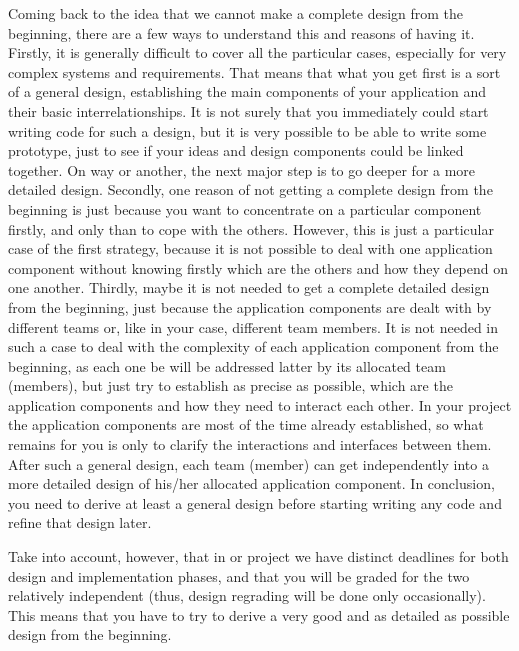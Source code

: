 Coming back to the idea that we cannot make a complete design from the beginning, there are a few ways to understand this and reasons of having it. Firstly, it is generally difficult to cover all the particular cases, especially for very complex systems and requirements. That means that what you get first is a sort of a general design, establishing the main components of your application and their basic interrelationships. It is not surely that you immediately could start writing code for such a design, but it is very possible to be able to write some prototype, just to see if your ideas and design components could be linked together. On way or another, the next major step is to go deeper for a more detailed design. Secondly, one reason of not getting a complete design from the beginning is just because you want to concentrate on a particular component firstly, and only than to cope with the others. However, this is just a particular case of the first strategy, because it is not possible to deal with one application component without knowing firstly which are the others and how they depend on one another. Thirdly, maybe it is not needed to get a complete detailed design from the beginning, just because the application components are dealt with by different teams or, like in your case, different team members. It is not needed in such a case to deal with the complexity of each application component from the beginning, as each one be will be addressed latter by its allocated team (members), but just try to establish as precise as possible, which are the application components and how they need to interact each other. In your \OSName{} project the application components are most of the time already established, so what remains for you is only to clarify the interactions and interfaces between them. After such a general design, each team (member) can get independently into a more detailed design of his/her allocated application component. 
In conclusion, you need to derive at least a general design before starting writing any code and refine that design later. 

Take into  account, however, that in or project we have distinct deadlines for both design and implementation phases, and that you will be graded for the two relatively independent (thus, design regrading will be done only occasionally). This means that you have to try to derive a very good and as detailed as possible design from the beginning.  


